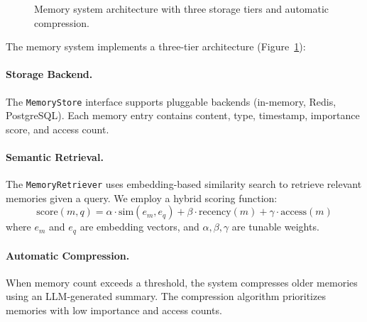 \begin{figure}[t]
\centering
{}
\caption{Memory system architecture with three storage tiers and automatic compression.}
\label{fig:memory}
\end{figure}

The memory system implements a three-tier architecture (Figure~\ref{fig:memory}):

\paragraph{Storage Backend.} The \texttt{MemoryStore} interface supports pluggable backends (in-memory, Redis, PostgreSQL). Each memory entry contains content, type, timestamp, importance score, and access count.

\paragraph{Semantic Retrieval.} The \texttt{MemoryRetriever} uses embedding-based similarity search to retrieve relevant memories given a query. We employ a hybrid scoring function:
\begin{equation}
    \text{score}(m, q) = \alpha \cdot \text{sim}(e_m, e_q) + \beta \cdot \text{recency}(m) + \gamma \cdot \text{access}(m)
\end{equation}
where $e_m$ and $e_q$ are embedding vectors, and $\alpha, \beta, \gamma$ are tunable weights.

\paragraph{Automatic Compression.} When memory count exceeds a threshold, the system compresses older memories using an LLM-generated summary. The compression algorithm prioritizes memories with low importance and access counts.

